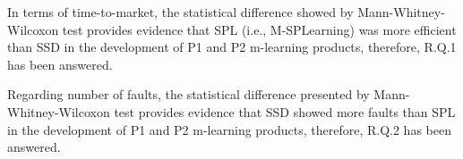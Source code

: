 \begin{table}
\end{table}

In terms of time-to-market, the statistical difference showed by Mann-Whitney-Wilcoxon test provides evidence that SPL (i.e., M-SPLearning) was more efficient than SSD in the development of P1 and P2 m-learning products, therefore, R.Q.1 has been answered.

Regarding number of faults, the statistical difference presented by Mann-Whitney-Wilcoxon test provides evidence that SSD showed more faults than SPL in the development of P1 and P2 m-learning products, therefore, R.Q.2 has been answered.


